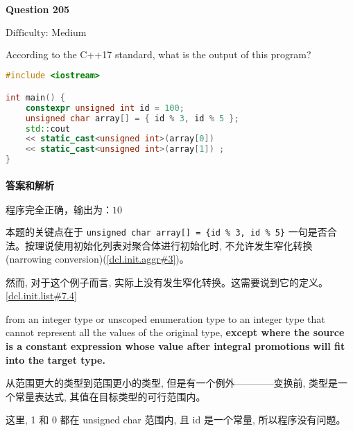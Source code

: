 \documentclass{article}
\begin{document}
	\paragraph*{Question 205} $\boxed{\text{Difficulty: Medium}} $			
	
	According to the C++17 standard, what is the output of this program?
	
	\begin{lstlisting}[language=C++]  		
#include <iostream>

int main() {
	constexpr unsigned int id = 100;
	unsigned char array[] = { id % 3, id % 5 };
	std::cout
	<< static_cast<unsigned int>(array[0])
	<< static_cast<unsigned int>(array[1]) ;
}
	\end{lstlisting}
	
	\paragraph*{答案和解析} $\boxed{\text{程序完全正确，输出为：10}} $
	
	本题的关键点在于 \verb|unsigned char array[] = {id % 3, id % 5}| 一句是否合法。按理说使用初始化列表对聚合体进行初始化时, 不允许发生窄化转换(narrowing conversion)(\href{https://timsong-cpp.github.io/cppwp/n4659/dcl.init.aggr#3}{[dcl.init.aggr\#3]})。
	
	然而, 对于这个例子而言, 实际上没有发生窄化转换。这需要说到它的定义。
	\href{https://timsong-cpp.github.io/cppwp/n4659/dcl.init.list#7.4}{[dcl.init.list\#7.4]}
	
	\begin{lightgrayleftbar}
		from an integer type or unscoped enumeration type to an integer type that cannot represent all the values of the original type, \textbf{except where the source is a constant expression whose value after integral promotions will fit into the target type. }
	\end{lightgrayleftbar}
	
	从范围更大的类型到范围更小的类型, 但是有一个例外————变换前, 类型是一个常量表达式, 其值在目标类型的可行范围内。
	
	这里, 1 和 0 都在 unsigned char 范围内, 且 id 是一个常量, 所以程序没有问题。
\end{document}

